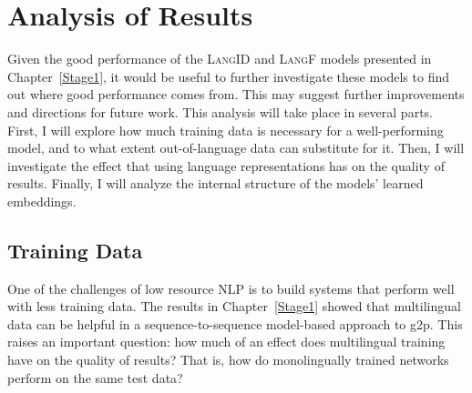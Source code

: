 
\chapter{Analysis of Results} %

\label{Analysis} %


Given the good performance of the \textsc{LangID} and \textsc{LangF} models presented in Chapter~\ref{Stage1}, it would be useful to further investigate these models to find out where good performance comes from. This may suggest further improvements and directions for future work. This analysis will take place in several parts. First, I will explore how much training data is necessary for a well-performing model, and to what extent out-of-language data can substitute for it. Then, I will investigate the effect that using language representations has on the quality of results. Finally, I will analyze the internal structure of the models' learned embeddings.


\section{Training Data}
One of the challenges of low resource NLP is to build systems that perform well with less training data. The results in Chapter~\ref{Stage1} showed that multilingual data can be helpful in a sequence-to-sequence model-based approach to g2p. This raises an important question: how much of an effect does multilingual training have on the quality of results? That is, how do monolingually trained networks perform on the same test data?


